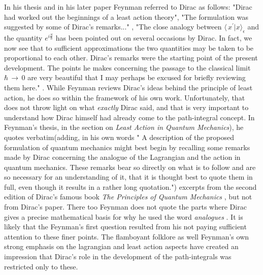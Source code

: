 \documentclass[a4paper]{JHEP3}
\begin{document}
In his thesis \cite{thesis} and in his later paper \cite{feynpaper} Feynman referred to Dirac as follows: "Dirac had worked out the beginnings
of a least action theory"\cite{thesis}, "The formulation was suggested by some of Dirac's remarks..." \cite{feynpaper}, "The close analogy
between $\langle\,x^\prime|x\rangle_{\epsilon}$ and the quantity $e^{i\frac{S}{\hbar}}$ has been pointed out on several occasions by Dirac. In
fact, we now see that to sufficient approximations the two quantities may be taken to be proportional to each other. Dirac's remarks were the starting point of the present development. The points he makes concerning the passage to the classical limit $\hbar\,\rightarrow\,0$ are very
beautiful that I may perhaps be excused for briefly reviewing them here." \cite{feynpaper}. While Feynman reviews Dirac's ideas behind the principle
of least action, he does so within the framework of his own work. Unfortunately, that does not throw light on what {\it exactly} Dirac said, and
that is very important to understand how Dirac himself had already come to the path-integral concept. In Feynman's thesis, in the section on {\it Least Action in Quantum Mechanics}), he quotes verbatim(adding, in his own words "
A description of the proposed formulation of quantum mechanics
might best begin by recalling some remarks made by Dirac concerning
the analogue of the Lagrangian and the action in quantum
mechanics. These remarks bear so directly on what is to follow and
are so necessary for an understanding of it, that it is thought best to
quote them in full, even though it results in a rather long quotation.")
excerpts from the second edition of Dirac's famous book {\it The Principles of Quantum Mechanics} \cite{diracbook2}, but not from Dirac's paper.
There too Feynman  does not quote the parts where Dirac gives a precise mathematical basis for why he used the word \emph{analogues} . 
It is likely that the Feynman's first question resulted from  his not paying sufficient attention to these finer points. The flamboyant
folklore as well Feynman's own strong emphasis on the lagrangian and least action aspects have created an impression that Dirac's role in the 
development of the path-integrals was restricted only to these.
\end{document}
